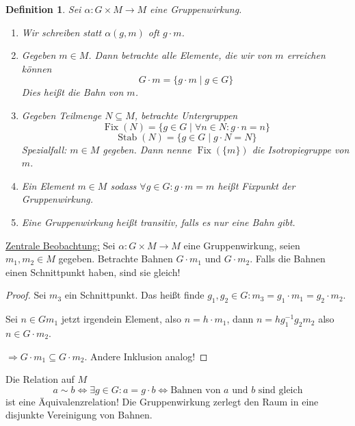\documentclass[a4paper,12pt,numbers=noenddot,parskip=full]{scrartcl}
\newcommand{\heading}{\underline}
\theoremstyle{dotless}
\newtheorem{definition}[theorem]{Definition}
\theoremstyle{remark}
\begin{document}
	\begin{definition}
		\label{def:transivGruppe}
		Sei $\alpha: G \times M \to M$ eine Gruppenwirkung.
		\begin{enumerate}
			\item Wir schreiben statt $\alpha(g,m)$ oft $g \cdot m$.
			\item Gegeben $m \in M$. Dann betrachte alle Elemente, die wir von $m$ erreichen können
			\begin{equation*}
			G \cdot m = \{ g \cdot m \mid g \in G \}
			\end{equation*}
			Dies heißt die Bahn von $m$.
			\item Gegeben Teilmenge $N \subseteq M$, betrachte Untergruppen
			\begin{equation*}
				\operatorname{Fix}(N) = \{ g \in G \mid \forall n \in N: g \cdot n = n \}
			\end{equation*}
			\begin{equation*}
				\operatorname{Stab}(N) = \{ g \in G \mid g \cdot N = N \}
			\end{equation*}
			Spezialfall: $m \in M$ gegeben. Dann nenne $\operatorname{Fix}(\{ m \})$ die Isotropiegruppe von $m$.
			\item Ein Element $m \in M$ sodass $\forall g \in G: g \cdot m = m$ heißt Fixpunkt der Gruppenwirkung.
			\item Eine Gruppenwirkung heißt transitiv, falls es nur eine Bahn gibt.
		\end{enumerate}
	\end{definition}

	\heading{Zentrale Beobachtung:} Sei $\alpha: G \times M \to M$ eine Gruppenwirkung, seien $m_1, m_2 \in M$ gegeben. Betrachte Bahnen $G \cdot m_1$ und $G \cdot m_2$. Falls die Bahnen einen Schnittpunkt haben, sind sie gleich!
	
	\begin{proof}
		Sei $m_3$ ein Schnittpunkt. Das heißt finde $g_1, g_2 \in G: m_3 = g_1 \cdot m_1 = g_2 \cdot m_2$.
		
		Sei $n \in G m_1$ jetzt irgendein Element, also $n = h \cdot m_1$, dann $n = h g_1^{-1} g_2 m_2$ also $n \in G \cdot m_2$.
		
		$\Rightarrow G \cdot m_1 \subseteq G \cdot m_2$. Andere Inklusion analog!
	\end{proof}

	Die Relation auf $M$
	\begin{equation*}
		a \sim b \Leftrightarrow \exists g \in G: a = g \cdot b \Leftrightarrow \text{Bahnen von $a$ und $b$ sind gleich}
	\end{equation*}
	ist eine Äquivalenzrelation! Die Gruppenwirkung zerlegt den Raum in eine disjunkte Vereinigung von Bahnen.
	
\end{document}
